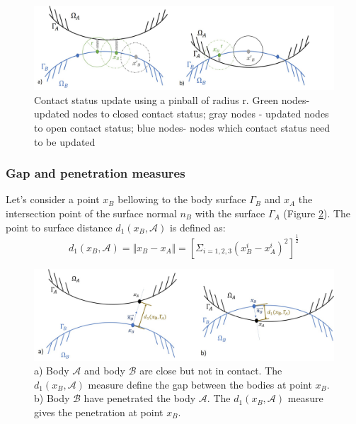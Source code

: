 \begin{figure}[!h]
\centering
\includegraphics[width=1\textwidth,keepaspectratio]{figures/pinball.jpg} 
\caption{Contact status update using a pinball of radius r. Green nodes- updated nodes to closed contact status; gray nodes - updated nodes to open contact status; blue nodes- nodes which contact status need to be updated}
\label{fig:pinball}
\end{figure}

 
 \subsubsection*{Gap and penetration measures} 
  Let's consider a point $x_B$ bellowing to the body surface $\Gamma_B$ and $x_A$ the intersection point of the surface normal $n_B$ with the surface $\Gamma_A$ (Figure \ref{gap_penetration}). The point to surface distance $d_1(x_B,\mathcal{A})$  is defined as:
\begin{equation}
\label{normalContactdistance}
d_1(x_B,\mathcal{A}) = \Vert x_B-x_A \Vert = \left[  \Sigma_{i={1,2,3}}\left( x_B^i - x_A^i \right)^2\right]^{\frac{1}{2}}
\end{equation}


\begin{figure}[!h]
\centering
\includegraphics[width=1\textwidth,keepaspectratio]{figures/gap_penetration.jpg}
\caption{a) Body $\mathcal{A}$ and body $\mathcal{B}$ are close but not in contact. The $d_1(x_B,\mathcal{A})$ measure define the gap between the bodies at point $x_B$.  b) Body $\mathcal{B}$ have penetrated the body $\mathcal{A}$. The $d_1(x_B,\mathcal{A})$ measure gives the penetration at point $x_B$.}
\label{gap_penetration}
\end{figure}

